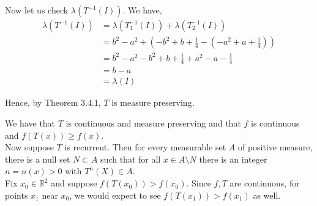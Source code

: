 \documentclass[12pt]{article}
\newenvironment{problem}[2][Problem]{\begin{trivlist}
\item[\hskip \labelsep {\bfseries #1}\hskip \labelsep {\bfseries #2.}]}{\end{trivlist}}
\begin{document}
Now let us check $\lambda(T^{-1}(I))$. We have,
\begin{align*}
\lambda(T^{-1}(I)) &= \lambda(T_1^{-1}(I)) + \lambda(T_2^{-1}(I))\\
&= b^2 - a^2 + (-b^2+b+\frac{1}{4} - (-a^2+a+\frac{1}{4}))\\
&= b^2 - a^2 - b^2 + b + \frac{1}{4} + a^2 - a - \frac{1}{4}\\
&= b - a\\
&= \lambda(I)
\end{align*}

Hence, by Theorem 3.4.1, $T$ is measure preserving.

\begin{problem}{2}
\end{problem}
We have that $T$ is continuous and measure preserving and that $f$ is continuous and $f(T(x)) \geq f(x)$.\\

Now suppose $T$ is recurrent. Then for every measurable set $A$ of positive measure, there is a null set $N \subset A$ such that for all $x \in A \setminus N$ there is an integer $n = n(x) > 0$ with $T^n(X) \in A$.\\

Fix $x_0 \in \mathbb{R}^2$ and suppose $f(T(x_0)) > f(x_0)$. Since $f, T$ are continuous, for points $x_1$ near $x_0$, we would expect to see $f(T(x_1)) > f(x_1)$ as well.


\begin{problem}{3}
\end{problem}
\end{document}
